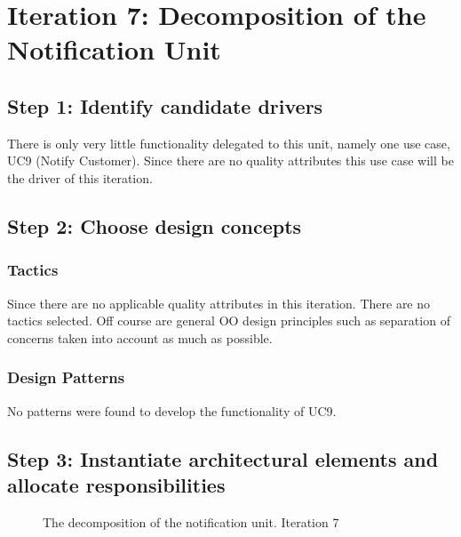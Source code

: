 \section{Iteration 7: Decomposition of the Notification Unit}
\label{add:it7}

\subsection{Step 1: Identify candidate drivers}
\label{add:it7/drivers}

\npar There is only very little functionality delegated to this unit, namely one
use case, UC9 (Notify Customer). Since there are no quality attributes this use
case will be the driver of this iteration.

\subsection{Step 2: Choose design concepts}
\label{add:it7/concepts}

\subsubsection{Tactics}
\label{add:it7/tactics}

\npar Since there are no applicable quality attributes in this iteration. There
are no tactics selected. Off course are general OO design principles such as
separation of concerns taken into account as much as possible.

\subsubsection{Design Patterns}
\label{add:it7/patterns}

\npar No patterns were found to develop the functionality of UC9.

\subsection{Step 3: Instantiate architectural elements and allocate responsibilities}
\label{add:it7/elements}

\begin{figure}[H]
	\begin{centering}
		\caption{The decomposition of the notification unit. Iteration 7}
		\label{fig:add/it7/decomposition}
	\end{centering}
\end{figure}


